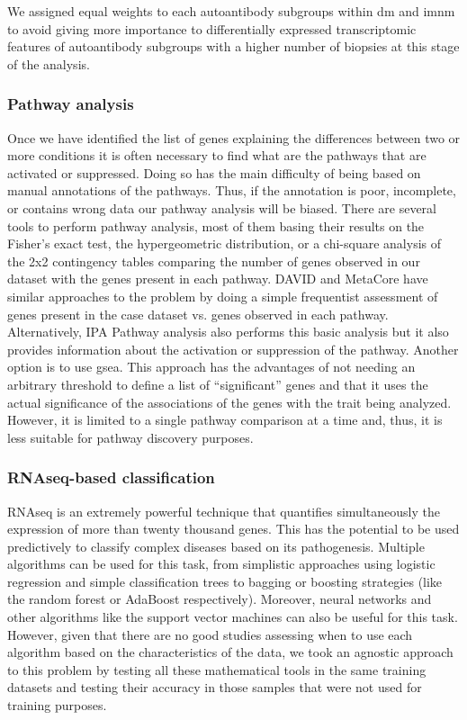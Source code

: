 We assigned equal weights to each autoantibody subgroups within \gls{dm} and  \gls{imnm} to avoid giving more importance to differentially expressed transcriptomic features of autoantibody subgroups with a higher number of biopsies at this stage of the analysis.

\subsubsection{Pathway analysis}
Once we have identified the list of genes explaining the differences between two or more conditions it is often necessary to find what are the pathways that are activated or suppressed. Doing so has the main difficulty of being based on manual annotations of the pathways. Thus, if the annotation is poor, incomplete, or contains wrong data our pathway analysis will be biased. There are several tools to perform pathway analysis, most of them basing their results on the Fisher’s exact test, the hypergeometric distribution, or a chi-square analysis of the 2x2 contingency tables comparing the number of genes observed in our dataset with the genes present in each pathway. DAVID and MetaCore have similar approaches to the problem by doing a simple frequentist assessment of genes present in the case dataset vs. genes observed in each pathway. Alternatively, IPA Pathway analysis also performs this basic analysis but it also provides information about the activation or suppression of the pathway. Another option is to use \gls{gsea}. This approach has the advantages of not needing an arbitrary threshold to define a list of “significant” genes and that it uses the actual significance of the associations of the genes with the trait being analyzed. However, it is limited to a single pathway comparison at a time and, thus, it is less suitable for pathway discovery purposes.

\subsubsection{RNAseq-based classification}
RNAseq is an extremely powerful technique that quantifies simultaneously the expression of more than twenty thousand genes. This has the potential to be used predictively to classify complex diseases based on its pathogenesis. Multiple algorithms can be used for this task, from simplistic approaches using logistic regression and simple classification trees to bagging or boosting strategies (like the random forest or AdaBoost respectively). Moreover, neural networks and other algorithms like the support vector machines can also be useful for this task. However, given that there are no good studies assessing when to use each algorithm based on the characteristics of the data, we took an agnostic approach to this problem by testing all these mathematical tools in the same training datasets and testing their accuracy in those samples that were not used for training purposes.

